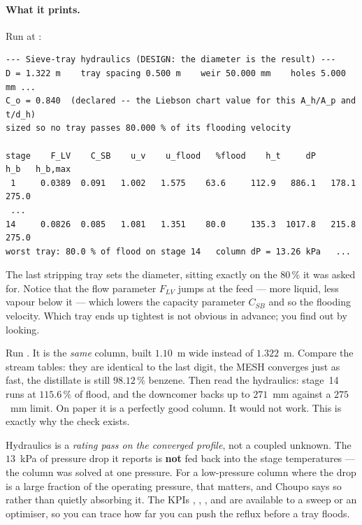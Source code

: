 \documentclass[11pt,a4paper]{article}
\begin{document}
\paragraph{What it prints.}  Run
 at
:

\begin{lstlisting}
--- Sieve-tray hydraulics (DESIGN: the diameter is the result) ---
D = 1.322 m    tray spacing 0.500 m    weir 50.000 mm    holes 5.000 mm ...
C_o = 0.840  (declared -- the Liebson chart value for this A_h/A_p and t/d_h)
sized so no tray passes 80.000 % of its flooding velocity

stage    F_LV    C_SB    u_v    u_flood   %flood    h_t     dP      h_b   h_b,max
 1     0.0389  0.091   1.002   1.575    63.6     112.9   886.1   178.1   275.0
 ...
14     0.0826  0.085   1.081   1.351    80.0     135.3  1017.8   215.8   275.0
worst tray: 80.0 % of flood on stage 14   column dP = 13.26 kPa   ...
\end{lstlisting}

The last stripping tray sets the diameter, sitting exactly on the
$80\,\%$ it was asked for.  Notice that the flow parameter $F_{LV}$
jumps at the feed --- more liquid, less vapour below it --- which lowers
the capacity parameter $C_{SB}$ and so the flooding velocity.  Which
tray ends up tightest is not obvious in advance; you find out by
looking.

\begin{tryit}
Run .  It is the \emph{same} column, built
$1.10$~m wide instead of $1.322$~m.  Compare the stream tables: they
are identical to the last digit, the MESH converges just as fast, the
distillate is still $98.12\,\%$ benzene.  Then read the hydraulics:
stage~14 runs at $115.6\,\%$ of flood, and the downcomer backs up to
$271$~mm against a $275$~mm limit.  On paper it is a perfectly good
column.  It would not work.  This is exactly why the check exists.
\end{tryit}

\begin{pitfall}
Hydraulics is a \emph{rating pass on the converged profile}, not a
coupled unknown.  The $13$~kPa of pressure drop it reports is
\textbf{not} fed back into the stage temperatures --- the column was
solved at one pressure.  For a low-pressure column where the drop is a
large fraction of the operating pressure, that matters, and Choupo says
so rather than quietly absorbing it.  The KPIs ,
, , 
and  are available to a sweep or an
optimiser, so you can trace how far you can push the reflux before a
tray floods.
\end{pitfall}
\end{document}
